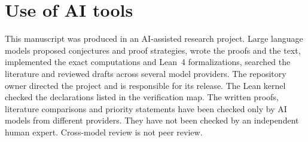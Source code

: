 \documentclass[11pt]{article}
\begin{document}
\section{Use of AI tools}

This manuscript was produced in an AI-assisted research project. Large language
models proposed conjectures and proof strategies, wrote the proofs and the text,
implemented the exact computations and Lean~4 formalizations, searched the
literature and reviewed drafts across several model providers. The repository
owner directed the project and is responsible for its release. The Lean kernel
checked the declarations listed in the verification map. The written proofs,
literature comparisons and priority statements have been checked only by AI
models from different providers. They have not been checked by an independent
human expert. Cross-model review is not peer review.



\end{document}
